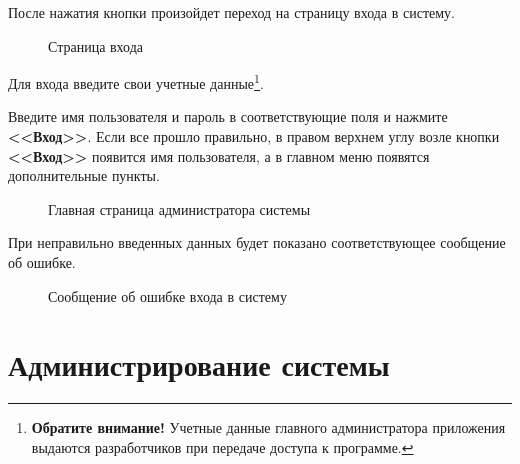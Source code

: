\documentclass[a4paper]{article}
\begin{document}
После нажатия кнопки произойдет переход на страницу входа в систему.

\begin{figure}[h]
\caption{Страница входа}
\label{fig:image5}
\end{figure}

Для входа введите свои учетные данные\footnote{\textbf{Обратите внимание!} Учетные данные главного администратора приложения выдаются разработчиков при передаче доступа к программе.}.

Введите имя пользователя и пароль в соответствующие поля и нажмите \textbf{<<Вход>>}. Если все прошло правильно, в правом верхнем углу возле кнопки \textbf{<<Вход>>} появится имя пользователя, а в главном меню появятся дополнительные пункты.

\begin{figure}[h]
\caption{Главная страница администратора системы}
\label{fig:image6}
\end{figure}

При неправильно введенных данных будет показано соответствующее сообщение об ошибке.

\begin{figure}[h]
\caption{Сообщение об ошибке входа в систему}
\label{fig:image7}
\end{figure}

\section{Администрирование системы}
\end{document}

